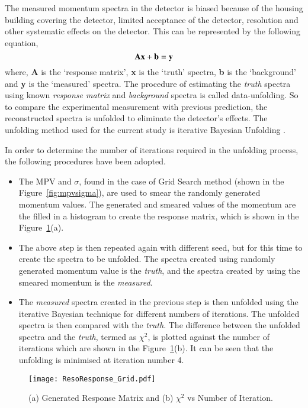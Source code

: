 The measured momentum spectra in the detector is biased
because of the housing building covering the detector, limited
acceptance of the detector, resolution and other systematic effects
on the detector. This can be represented by the following equation,
\begin{equation}
  {\bf A}{\bf x}+{\bf b}={\bf y}
  \label{eq:unfold}
\end{equation}
where, {\bf A} is the `response matrix', {\bf x} is the `truth' spectra,
{\bf b} is the `background' and {\bf y} is the `measured' spectra.
The procedure of estimating the {\it truth} spectra using known
{\it response matrix} and {\it background} spectra is called
data-unfolding. So to compare the experimental measurement with
previous prediction, the reconstructed spectra is unfolded to eliminate
the detector's effects.
The unfolding method used for the current
study is iterative Bayesian Unfolding \cite{bayesian}.

In order to determine the number of iterations required in the
unfolding process, the following procedures have been adopted.
\begin{itemize} %
\item The MPV and $\sigma$, found in the case of Grid Search method
  (shown in the Figure~\ref{fig:mpvsigma}), are used to smear
  the randomly generated momentum values. The generated and smeared
  values of the momentum are the filled in a histogram to create
  the response matrix, which is shown in the
  Figure~\ref{fig:unfolditer}(a).
\item The above step is then repeated again with different seed,
  but for this time to create the spectra to be unfolded. The spectra
  created using randomly generated momentum value is the {\it truth},
  and the spectra created by using the smeared momentum is the
  {\it measured}.
\item The {\it measured} spectra created in the previous step is then
  unfolded using the iterative Bayesian technique for different numbers
  of iterations. The unfolded spectra is then compared with the
  {\it truth}. The difference between the unfolded spectra and the
  {\it truth}, termed as $\chi^{2}$, is plotted against the number of
  iterations which are shown in the Figure~\ref{fig:unfolditer}(b).
  It can be seen that the unfolding is minimised at iteration number 4.
\end{itemize}
\begin{figure}[h]
  \centering
  \texttt{[image: ResoResponse\_Grid.pdf]}
  \caption{(a) Generated Response Matrix and
    (b) $\chi^{2}$ vs Number of Iteration.}
  \label{fig:unfolditer}
\end{figure}

